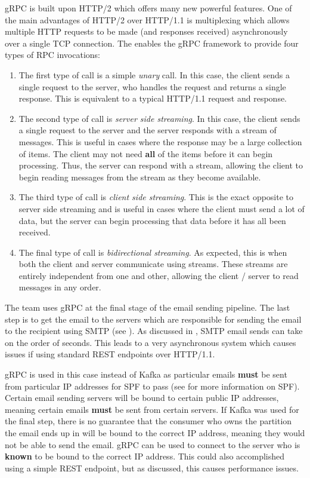 gRPC is built upon HTTP/2 which offers many new powerful features. One of the main advantages of HTTP/2 over HTTP/1.1 is multiplexing which allows multiple HTTP requests to be made (and responses received) asynchronously over a single TCP connection. The enables the gRPC framework to provide four types of RPC invocations:

\begin{enumerate}
  \item{The first type of call is a simple \textit{unary} call. In this case, the client sends a single request to the server, who handles the request and returns a single response. This is equivalent to a typical HTTP/1.1 request and response.}
  \item{The second type of call is \textit{server side streaming}. In this case, the client sends a single request to the server and the server responds with a stream of messages. This is useful in cases where the response may be a large collection of items. The client may not need \textbf{all} of the items before it can begin processing. Thus, the server can respond with a stream, allowing the client to begin reading messages from the stream as they become available.}
  \item{The third type of call is \textit{client side streaming}. This is the exact opposite to server side streaming and is useful in cases where the client must send a lot of data, but the server can begin processing that data before it has all been received.}
  \item{The final type of call is \textit{bidirectional streaming}. As expected, this is when both the client and server communicate using streams. These streams are entirely independent from one and other, allowing the client / server to read messages in any order.}
\end{enumerate}

The \team{} team uses gRPC at the final stage of the email sending pipeline. The last step is to get the email to the servers which are responsible for sending the email to the recipient using SMTP (see ). As discussed in , SMTP email sends can take on the order of seconds. This leads to a very asynchronous system which causes issues if using standard REST endpoints over HTTP/1.1. 

gRPC is used in this case instead of Kafka as particular emails \textbf{must} be sent from particular IP addresses for SPF to pass (see  for more information on SPF). Certain email sending servers will be bound to certain public IP addresses, meaning certain emails \textbf{must} be sent from certain servers. If Kafka was used for the final step, there is no guarantee that the consumer who owns the partition the email ends up in will be bound to the correct IP address, meaning they would not be able to send the email. gRPC can be used to connect to the server who is \textbf{known} to be bound to the correct IP address. This could also accomplished using a simple REST endpoint, but as discussed, this causes performance issues.

